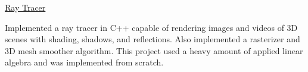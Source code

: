 \begin{cventries}
  \cventry
    {} %
    {\href{https://github.com/dangbert/raytracer/tree/master}{Ray Tracer}} %
    {} %
    {} %
    {
      \begin{cvitems} %
      \item {Implemented a ray tracer in C++ capable of rendering images and videos of 3D scenes with shading, shadows, and reflections.  Also implemented a rasterizer and 3D mesh smoother algorithm.  This project used a heavy amount of applied linear algebra and was implemented from scratch.}
      \end{cvitems}
    }

\end{cventries}

